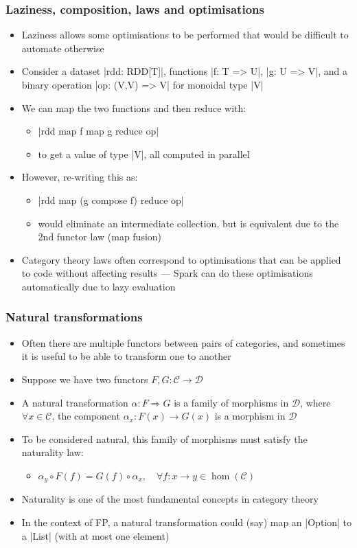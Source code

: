 \documentclass[mathserif,handout]{beamer}
\begin{document}
\begin{frame}[fragile]
  \frametitle{Laziness, composition, laws and optimisations}
  \begin{itemize}
    \item Laziness allows some optimisations to be performed that would be difficult to automate otherwise
    \item Consider a dataset |rdd: RDD[T]|, functions |f: T => U|, |g: U => V|, and a binary operation |op: (V,V) => V| for monoidal type |V|
    \item We can map the two functions and then reduce with:
      \begin{itemize}
      \item |rdd map f map g reduce op|
        \item to get a value of type |V|, all computed in parallel
      \end{itemize}
    \item However, re-writing this as:
      \begin{itemize}
      \item |rdd map (g compose f) reduce op|
        \item would eliminate an intermediate collection, but is equivalent due to the 2nd functor law (\alert{map fusion})
      \end{itemize}
      \item Category theory \alert{laws} often correspond to \alert{optimisations} that can be applied to code without affecting results --- Spark can do these optimisations \alert{automatically} due to lazy evaluation
  \end{itemize}
\end{frame}


\begin{frame}[fragile]
  \frametitle{Natural transformations}
  \begin{itemize}
  \item Often there are multiple functors between pairs of categories, and sometimes it is useful to be able to transform one to another
  \item Suppose we have two functors $F,G: \mathcal{C}\longrightarrow\mathcal{D}$
  \item A \alert{natural transformation} $\alpha: F \Rightarrow G$ is a family of morphisms in $\mathcal{D}$, where $\forall x\in\mathcal{C}$, the \alert{component} $\alpha_x:F(x)\longrightarrow G(x)$ is a morphism in $\mathcal{D}$
  \item To be considered \alert{natural}, this family of morphisms must satisfy the \alert{naturality law}:
    \begin{itemize}
    \item $\alpha_y\circ F(f) = G(f)\circ \alpha_x,\quad \forall f: x\longrightarrow y \in \operatorname{hom}(\mathcal{C})$
    \end{itemize}
  \item \alert{Naturality} is one of the most fundamental concepts in category theory
    \item In the context of FP, a natural transformation could (say) map an |Option| to a |List| (with at most one element)
  \end{itemize}
\end{frame}
\end{document}
